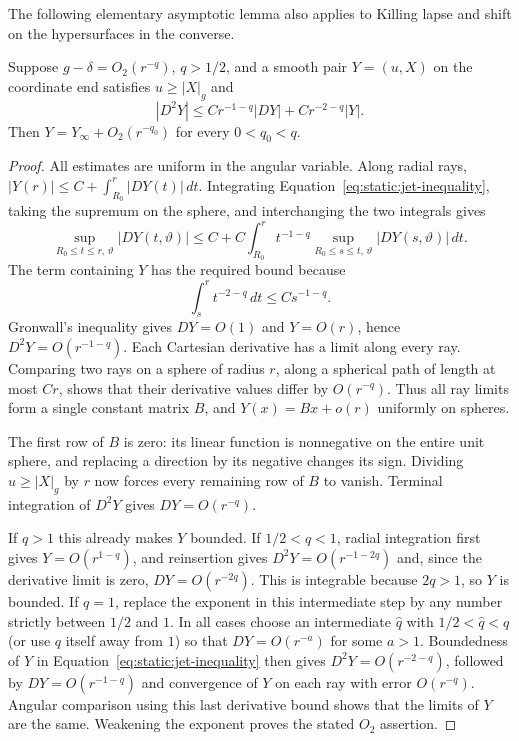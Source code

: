 The following elementary asymptotic lemma also applies to Killing
lapse and shift on the hypersurfaces in the converse.

\begin{lemma}\label{lem:static:end-jets}
Suppose $g-\delta=O_2(r^{-q})$, $q>1/2$, and a smooth pair
$Y=(u,X)$ on the coordinate end satisfies $u\geq|X|_g$ and
\begin{equation}\label{eq:static:jet-inequality}
 |D^2Y|\leq C r^{-1-q}|DY|+C r^{-2-q}|Y|.
\end{equation}
Then $Y=Y_\infty+O_2(r^{-q_0})$ for every $0<q_0<q$.
\end{lemma}

\begin{proof}
All estimates are uniform in the angular variable.  Along radial rays,
$|Y(r)|\leq C+\int_{R_0}^r|DY(t)|\,dt$.  Integrating
Equation~\eqref{eq:static:jet-inequality}, taking the supremum on the
sphere, and interchanging the two integrals gives
\[
 \sup_{R_0\leq t\leq r,\,\vartheta}|DY(t,\vartheta)|
 \leq C+C\int_{R_0}^r t^{-1-q}
       \sup_{R_0\leq s\leq t,\,\vartheta}|DY(s,\vartheta)|\,dt.
\]
The term containing $Y$ has the required bound because
\[
 \int_s^r t^{-2-q}\,dt\leq C s^{-1-q}.
\]
Gronwall's inequality gives $DY=O(1)$ and $Y=O(r)$, hence
$D^2Y=O(r^{-1-q})$.  Each Cartesian derivative has a limit along
every ray.  Comparing two rays on a sphere of radius $r$, along a
spherical path of length at most $C r$, shows that their derivative
values differ by $O(r^{-q})$.  Thus all ray limits form a single
constant matrix $B$, and $Y(x)=Bx+o(r)$ uniformly on spheres.

The first row of $B$ is zero: its linear function is nonnegative on
the entire unit sphere, and replacing a direction by its negative
changes its sign.  Dividing $u\geq|X|_g$ by $r$ now forces every
remaining row of $B$ to vanish.  Terminal integration of $D^2Y$ gives
$DY=O(r^{-q})$.

If $q>1$ this already makes $Y$ bounded.  If $1/2<q<1$, radial
integration first gives $Y=O(r^{1-q})$, and reinsertion gives
$D^2Y=O(r^{-1-2q})$ and, since the derivative limit is zero,
$DY=O(r^{-2q})$.  This is integrable because $2q>1$, so $Y$ is
bounded.  If $q=1$, replace the exponent in this intermediate step
by any number strictly between $1/2$ and $1$.
In all cases choose an intermediate $\widehat q$ with
$1/2<\widehat q<q$ (or use $q$ itself away from $1$) so that
$DY=O(r^{-a})$ for some $a>1$.  Boundedness of $Y$ in
Equation~\eqref{eq:static:jet-inequality} then gives
$D^2Y=O(r^{-2-q})$, followed by $DY=O(r^{-1-q})$ and convergence
of $Y$ on each ray with error $O(r^{-q})$.  Angular comparison using
this last derivative bound shows that the limits of $Y$ are the
same.  Weakening the exponent proves the stated $O_2$ assertion.
\end{proof}

